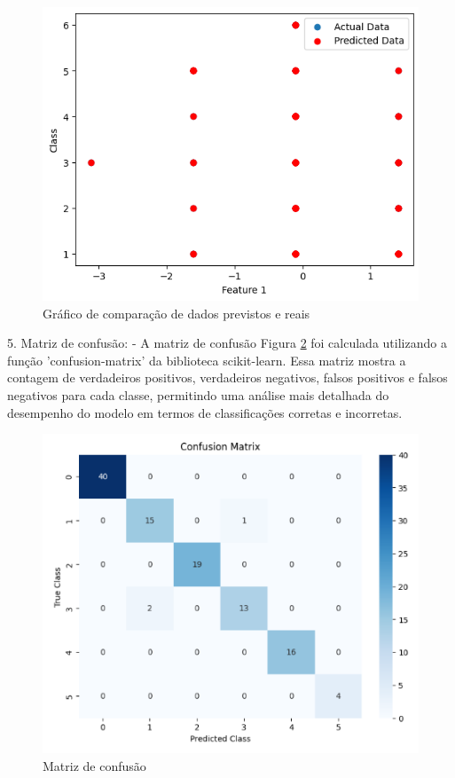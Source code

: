 \documentclass[conference]{IEEEtran}
\begin{document}
\begin{figure}[htbp]
    \centerline{\includegraphics[width = 1.0\linewidth]{./figuras/figura5.png}}
    \caption{Gráfico de comparação de dados previstos e reais}
    \label{fig:dados}
\end{figure}

5. Matriz de confusão:
   - A matriz de confusão Figura \ref{fig:confusao} foi calculada utilizando a função 'confusion-matrix' da biblioteca scikit-learn. Essa matriz mostra a contagem de verdadeiros positivos, verdadeiros negativos, falsos positivos e falsos negativos para cada classe, permitindo uma análise mais detalhada do desempenho do modelo em termos de classificações corretas e incorretas.

\begin{figure}[htbp]
    \centerline{\includegraphics[width = 1.0\linewidth]{./figuras/figura6.png}}
    \caption{Matriz de confusão}
    \label{fig:confusao}
\end{figure}
\end{document}
